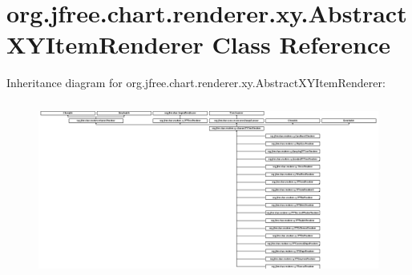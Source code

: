 \hypertarget{classorg_1_1jfree_1_1chart_1_1renderer_1_1xy_1_1_abstract_x_y_item_renderer}{}\section{org.\+jfree.\+chart.\+renderer.\+xy.\+Abstract\+X\+Y\+Item\+Renderer Class Reference}
\label{classorg_1_1jfree_1_1chart_1_1renderer_1_1xy_1_1_abstract_x_y_item_renderer}
Inheritance diagram for org.\+jfree.\+chart.\+renderer.\+xy.\+Abstract\+X\+Y\+Item\+Renderer\+:\begin{figure}[H]
\begin{center}
\leavevmode
\includegraphics[height=5.816024cm]{classorg_1_1jfree_1_1chart_1_1renderer_1_1xy_1_1_abstract_x_y_item_renderer}
\end{center}
\end{figure}
